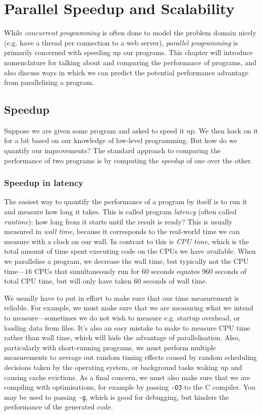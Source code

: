\chapter{Parallel Speedup and Scalability}

While \emph{concurrent programming} is often done to model the problem
domain nicely (e.g. have a thread per connection to a web server),
\emph{parallel programming} is primarily concerned with speeding up
our programs.  This chapter will introduce nomenclature for talking
about and comparing the performance of programs, and also discuss ways
in which we can predict the potential performance advantage from
parallelising a program.

\section{Speedup}
\label{sec:speedup}

Suppose we are given some program and asked to speed it up.  We then
hack on it for a bit based on our knowledge of low-level programming.
But how do we quantify our improvements?  The standard approach to
comparing the performance of two programs is by computing the
\emph{speedup} of one over the other.

\subsection{Speedup in latency}
\label{sec:speedup-in-latency}

The easiest way to quantify the performance of a program by itself is
to run it and measure how long it takes.  This is called program
\emph{latency} (often called \emph{runtime}): how long from it starts
until the result is ready?  This is usually measured in \emph{wall
  time}, because it corresponds to the real-world time we can measure
with a clock on our wall.  In contrast to this is \emph{CPU time},
which is the total amount of time spent executing code on the CPUs we
have available.  When we parallelise a program, we decrease the wall
time, but typically not the CPU time---$16$ CPUs that simultaneously
run for $60$ seconds equates $960$ seconds of total CPU time, but will
only have taken $60$ seconds of wall time.

We usually have to put in effort to make sure that our time
measurement is reliable.  For example, we must make sure that we are
measuring what we intend to measure---sometimes we do not wish to
measure e.g. startup overhead, or loading data from files.  It's also
an easy mistake to make to measure CPU time rather than wall time,
which will hide the advantage of parallelisation.  Also, particularly
with short-running programs, we must perform multiple measurements to
average out random timing effects caused by random scheduling
decisions taken by the operating system, or background tasks waking up
and causing cache evictions.  As a final concern, we must also make
sure that we are compiling with optimisations, for example by passing
\texttt{-O3} to the C compiler.  You may be used to passing
\texttt{-g}, which is good for debugging, but hinders the performance
of the generated code.

